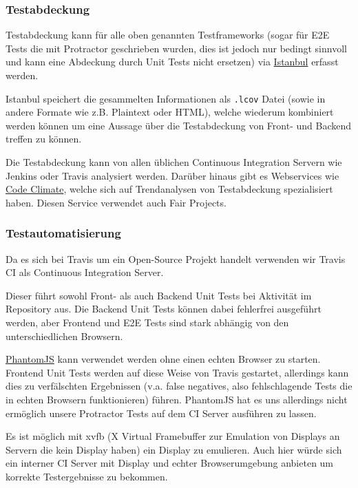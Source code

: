 \subsubsection{Testabdeckung}\label{testabdeckung}

Testabdeckung kann für alle oben genannten Testframeworks (sogar für E2E
Tests die mit Protractor geschrieben wurden, dies ist jedoch nur bedingt
sinnvoll und kann eine Abdeckung durch Unit Tests nicht ersetzen) via
\href{https://gotwarlost.github.io/istanbul/}{Istanbul} erfasst werden.

Istanbul speichert die gesammelten Informationen als \texttt{.lcov}
Datei (sowie in andere Formate wie z.B. Plaintext oder HTML), welche
wiederum kombiniert werden können um eine Aussage über die Testabdeckung
von Front- und Backend treffen zu können.

Die Testabdeckung kann von allen üblichen Continuous Integration Servern
wie Jenkins oder Travis analysiert werden. Darüber hinaus gibt es
Webservices wie
\href{https://codeclimate.com/github/mihaeu/fair-projects/coverage}{Code
Climate}, welche sich auf Trendanalysen von Testabdeckung spezialisiert
haben. Diesen Service verwendet auch Fair Projects.

\subsubsection{Testautomatisierung}\label{testautomatisierung}

Da es sich bei Travis um ein Open-Source Projekt handelt verwenden wir
Travis CI als Continuous Integration Server.

Dieser führt sowohl Front- als auch Backend Unit Tests bei Aktivität im
Repository aus. Die Backend Unit Tests können dabei fehlerfrei
ausgeführt werden, aber Frontend und E2E Tests sind stark abhängig von
den unterschiedlichen Browsern.

\href{http://phantomjs.org/}{PhantomJS} kann verwendet werden ohne einen
echten Browser zu starten. Frontend Unit Tests werden auf diese Weise
von Travis gestartet, allerdings kann dies zu verfälschten Ergebnissen
(v.a. false negatives, also fehlschlagende Tests die in echten Browsern
funktionieren) führen. PhantomJS hat es uns allerdings nicht ermöglich
unsere Protractor Tests auf dem CI Server ausführen zu lassen.

Es ist möglich mit xvfb (X Virtual Framebuffer zur Emulation von
Displays an Servern die kein Display haben) ein Display zu emulieren.
Auch hier würde sich ein interner CI Server mit Display und echter
Browserumgebung anbieten um korrekte Testergebnisse zu bekommen.

